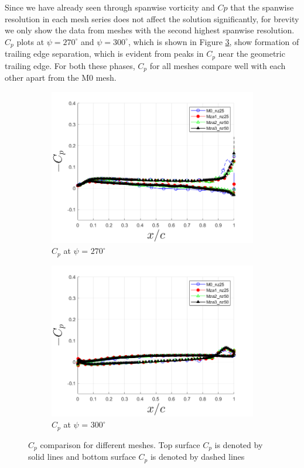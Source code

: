Since we have already seen through spanwise vorticity and $Cp$ that the spanwise resolution in each mesh series does not affect the solution significantly, for brevity we only show the data from meshes with the second highest spanwise resolution. 
$C_p$ plots at $\psi=270^\circ$ and $\psi=300^\circ$, which is shown in Figure \ref{fig:zonal_Cp_plots_TEV}, show formation of trailing edge separation, which is evident from peaks in $C_p$ near the geometric trailing edge. 
For both these phases, $C_p$ for all meshes compare well with each other apart from the M0 mesh.


\begin{figure}[H]
\begin{subfigure}[b]{0.475\textwidth}
\centering
\includegraphics[width=1\textwidth]{figures/zonal_adapt_results/Cp/phase_270.png}
\caption{ $C_p$ at $\psi$ = $270^\circ$}
\label{fig:zonal_Cp_270}
\end{subfigure}
\begin{subfigure}[b]{0.475\textwidth}
\centering
\includegraphics[width=1\textwidth]{figures/zonal_adapt_results/Cp/phase_300.png}
\caption{ $C_p$ at $\psi$ = $300^\circ$}
\label{fig:zonal_Cp_300}
\end{subfigure}
\caption{$C_p$ comparison for different meshes. Top surface $C_p$ is denoted by solid lines and bottom surface $C_p$ is denoted by dashed lines}
\label{fig:zonal_Cp_plots_TEV}
\end{figure}

